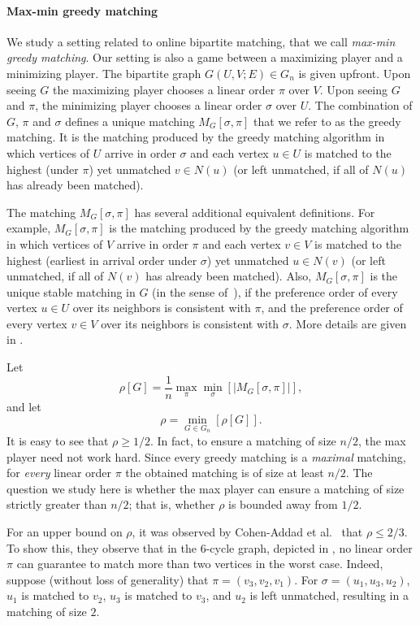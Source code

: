 \documentclass{toc}
\theoremstyle{plain}
\begin{document}
\paragraph*{Max-min greedy matching} We study a setting related to online bipartite matching, that we call
%
%
%
%
\emph{max-min greedy matching}.   %
Our setting is also a game between a maximizing player and a minimizing player. The bipartite graph $G(U,V;E)\in G_n$ is given upfront. Upon seeing $G$ the maximizing player chooses a linear order $\pi$ over $V$. Upon seeing $G$ and $\pi$, the minimizing player chooses a linear order $\sigma$ over $U$.
The combination of $G$, $\pi$ and $\sigma$ %
defines   %
a unique matching $M_G[\sigma,\pi]$ that we refer to as the greedy matching.
It is the matching produced by the greedy matching algorithm in which vertices of $U$ arrive in order $\sigma$ and each vertex $u \in U$ is matched to the highest (under $\pi$) yet unmatched $v \in N(u)$ (or left unmatched, if
%
all of $N(u)$ has already been matched).   %

The matching $M_G[\sigma,\pi]$ has several additional equivalent definitions.
For example, $M_G[\sigma,\pi]$ is the matching produced by the greedy matching algorithm in which vertices of $V$ arrive in order $\pi$ and each vertex $v \in V$ is matched to the highest (earliest in arrival order under $\sigma$) yet unmatched $u \in N(v)$ (or left unmatched, if
%
all of $N(v)$ has already been matched).  %
Also, $M_G[\sigma,\pi]$ is the unique stable matching in $G$ (in the sense of~\cite{GS62}), if the preference order of every vertex $u \in U$ over its neighbors is consistent with $\pi$, and the preference order of every vertex $v \in V$ over its neighbors is consistent with $\sigma$. More details are given in .

Let $$\rho[G] = \frac{1}{n} \max_{\pi} \min_{\sigma}[|M_G[\sigma,\pi]|],$$ and let $$\rho = \min_{G \in G_n}[\rho[G]].$$
It is easy to see that $\rho \ge 1/2$.
In fact, to ensure a matching of size $n/2$, the max player need not work hard.
Since every greedy matching is a \emph{maximal} matching, for \emph{every} linear order $\pi$ the obtained matching is of size at least $n/2$.
The question we study %
here  %
is whether the max player can ensure a matching of size strictly 
greater than $n/2$; that is, whether $\rho$ is bounded away from $1/2$.  
%
%
%

For an upper bound on $\rho$, it was observed by Cohen-Addad et al.~\cite{Cohen-AddadEFF16} that $\rho \leq 2/3$.
To show this, they observe that in the 6-cycle graph, depicted in , no linear order $\pi$ can guarantee to match more than two vertices in the worst case. Indeed, suppose (without loss of generality) that $\pi=(v_3,v_2,v_1)$. For $\sigma=(u_1,u_3,u_2)$, $u_1$ is matched to $v_2$, $u_3$ is matched to $v_3$, and $u_2$ is left unmatched, resulting in a matching of size $2$.
\end{document}
